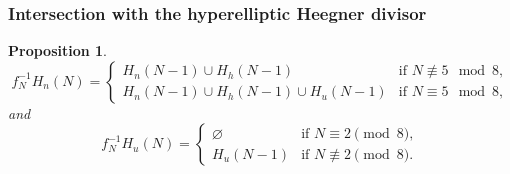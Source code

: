 \documentclass[11pt]{amsart}
\numberwithin{equation}{subsection}
\theoremstyle{plain}
\newtheorem{proposition}[theorem]{Proposition}
\theoremstyle{remark}
\theoremstyle{definition}
\newcommand{\es}{\varnothing}
\begin{document}
\subsubsection{Intersection with the hyperelliptic Heegner divisor}\label{subsubsec:inthyp}
%
\begin{proposition}\label{prp:invnod}
%
\begin{equation}\label{setenne} 
%
\scriptstyle f_N^{-1} H_n(N)=
%
\begin{cases}
%
\scriptstyle  H_n(N-1) \cup H_h (N-1) & \scriptstyle  \text{if  $N\not \equiv 5 \mod 8$,} \\
%
\scriptstyle  H_n(N-1) \cup H_h (N-1) \cup H_u(N-1) & \scriptstyle  \text{if  $N\equiv 5 \mod 8$,} 
%
\end{cases}
%
\end{equation}
%
and 
%
\begin{equation}\label{setunig} 
%
f_N^{-1} H_u(N)=
%
\begin{cases}
%
\es & \text{if $N\equiv 2\pmod{8}$,} \\
%
H_u(N-1) & \text{if $N\not\equiv 2\pmod{8}$.}
%
\end{cases}
%
%
\end{equation}
%
\end{proposition}
%
%
\end{document}
